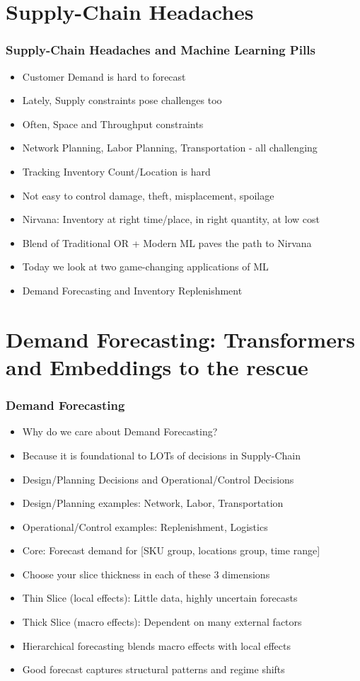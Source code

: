 \documentclass[handout]{beamer}
\begin{document}
\section{Supply-Chain Headaches}

\begin{frame}
\frametitle{Supply-Chain Headaches and Machine Learning Pills}
\pause
\begin{itemize}[<+->]
\item Customer Demand is hard to forecast
\item Lately, Supply constraints pose challenges too
\item Often, Space and Throughput constraints
\item Network Planning, Labor Planning, Transportation - all challenging
\item Tracking Inventory Count/Location is hard
\item Not easy to control damage, theft, misplacement, spoilage
\item Nirvana: Inventory at right time/place, in right quantity, at low cost
\item Blend of Traditional OR + Modern ML paves the path to Nirvana
\item Today we look at two game-changing applications of ML
\item Demand Forecasting and Inventory Replenishment
\end{itemize}
\end{frame}

\section{Demand Forecasting: Transformers and Embeddings to the rescue}

\begin{frame}
\frametitle{Demand Forecasting}
\pause
\begin{itemize}[<+->]
\item Why do we care about Demand Forecasting?
\item Because it is foundational to LOTs of decisions in Supply-Chain
\item Design/Planning Decisions and Operational/Control Decisions
\item Design/Planning examples: Network, Labor, Transportation
\item Operational/Control examples: Replenishment, Logistics
\item Core: Forecast demand for [SKU group, locations group, time range]
\item Choose your slice thickness in each of these 3 dimensions
\item Thin Slice (local effects): Little data, highly uncertain forecasts
\item Thick Slice (macro effects): Dependent on many external factors
\item Hierarchical forecasting blends macro effects with local effects
\item Good forecast captures structural patterns and regime shifts
\end{itemize}
\end{frame}
\end{document}
